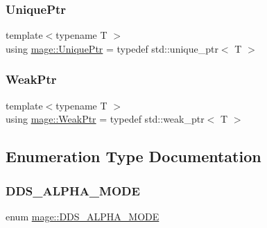 \hypertarget{namespacemage_a8c307fbcc33bce9b7f2aa4c26c3b95cf}{}\label{namespacemage_a8c307fbcc33bce9b7f2aa4c26c3b95cf} 
\subsubsection{\texorpdfstring{Unique\+Ptr}{UniquePtr}}
{\footnotesize\ttfamily template$<$typename T $>$ \\
using \hyperlink{namespacemage_a8c307fbcc33bce9b7f2aa4c26c3b95cf}{mage\+::\+Unique\+Ptr} = typedef std\+::unique\+\_\+ptr$<$ T $>$}

\hypertarget{namespacemage_aa159a63c0d58464bdf32dfe419dd5dc1}{}\label{namespacemage_aa159a63c0d58464bdf32dfe419dd5dc1} 
\subsubsection{\texorpdfstring{Weak\+Ptr}{WeakPtr}}
{\footnotesize\ttfamily template$<$typename T $>$ \\
using \hyperlink{namespacemage_aa159a63c0d58464bdf32dfe419dd5dc1}{mage\+::\+Weak\+Ptr} = typedef std\+::weak\+\_\+ptr$<$ T $>$}



\subsection{Enumeration Type Documentation}
\hypertarget{namespacemage_a0c586a2bad862f4858900ca121ca80c2}{}\label{namespacemage_a0c586a2bad862f4858900ca121ca80c2} 
\subsubsection{\texorpdfstring{D\+D\+S\+\_\+\+A\+L\+P\+H\+A\+\_\+\+M\+O\+DE}{DDS\_ALPHA\_MODE}}
{\footnotesize\ttfamily enum \hyperlink{namespacemage_a0c586a2bad862f4858900ca121ca80c2}{mage\+::\+D\+D\+S\+\_\+\+A\+L\+P\+H\+A\+\_\+\+M\+O\+DE}}

